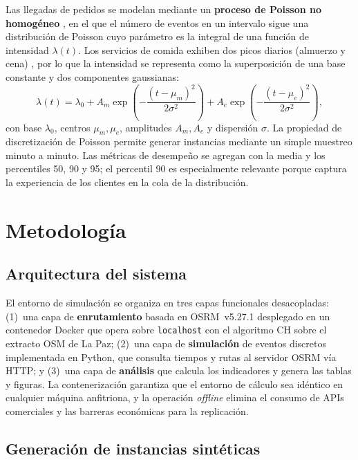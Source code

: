\documentclass[12pt,letterpaper]{article}
\begin{document}
Las llegadas de pedidos se modelan mediante un \textbf{proceso de Poisson no
homogéneo} \citep{Ross2014}, en el que el número de eventos en un intervalo sigue
una distribución de Poisson cuyo parámetro es la integral de una función de
intensidad $\lambda(t)$. Los servicios de comida exhiben dos picos diarios
(almuerzo y cena) \citep{Wu2023LaDe}, por lo que la intensidad se representa como
la superposición de una base constante y dos componentes gaussianas:
\begin{equation}
	\lambda(t) = \lambda_0
	+ A_m \exp\!\left(-\frac{(t-\mu_m)^2}{2\sigma^2}\right)
	+ A_e \exp\!\left(-\frac{(t-\mu_e)^2}{2\sigma^2}\right),
	\label{eq:intensity}
\end{equation}
con base $\lambda_0$, centros $\mu_m,\mu_e$, amplitudes $A_m,A_e$ y dispersión
$\sigma$. La propiedad de discretización de Poisson permite generar instancias
mediante un simple muestreo minuto a minuto. Las métricas de desempeño se agregan
con la media y los percentiles 50, 90 y 95; el percentil 90 es especialmente
relevante porque captura la experiencia de los clientes en la cola de la
distribución.

\section{Metodología}

\subsection{Arquitectura del sistema}

El entorno de simulación se organiza en tres capas funcionales desacopladas:
(1)~una capa de \textbf{enrutamiento} basada en OSRM~v5.27.1 desplegado en un
contenedor Docker \citep{Merkel2014} que opera sobre \texttt{localhost} con el
algoritmo CH sobre el extracto OSM de La Paz; (2)~una capa de \textbf{simulación}
de eventos discretos implementada en Python, que consulta tiempos y rutas al
servidor OSRM vía HTTP; y (3)~una capa de \textbf{análisis} que calcula los
indicadores y genera las tablas y figuras. La contenerización garantiza que el
entorno de cálculo sea idéntico en cualquier máquina anfitriona, y la operación
\textit{offline} elimina el consumo de APIs comerciales y las barreras económicas
para la replicación.

\subsection{Generación de instancias sintéticas}
\end{document}
